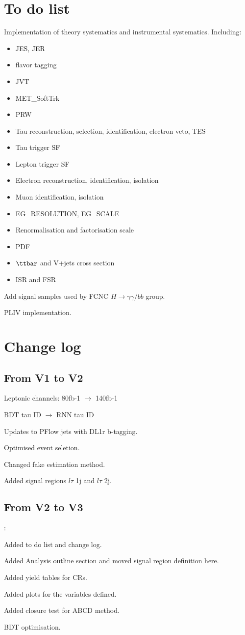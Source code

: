 \section{To do list}

Implementation of theory systematics and instrumental systematics. Including:

\begin{itemize}
	\item JES, JER
	\item flavor tagging
	\item JVT
	\item MET\_SoftTrk
	\item PRW
	\item Tau reconstruction, selection, identification, electron veto, TES
	\item Tau trigger SF
	\item Lepton trigger SF
	\item Electron reconstruction, identification, isolation
	\item Muon identification, isolation
	\item EG\_RESOLUTION, EG\_SCALE
	\item Renormalisation and factorisation scale
	\item PDF
	\item $\ttbar$ and V+jets cross section
	\item ISR and FSR
\end{itemize}

Add signal samples used by FCNC $H\to \gamma\gamma/bb$ group.

PLIV implementation.

\section{Change log}

\subsection{From V1 to V2}

Leptonic channels:  80fb-1 $\to$ 140fb-1

BDT tau ID $\to$ RNN tau ID

Updates to PFlow jets with DL1r b-tagging.

Optimised event seletion.

Changed fake estimation method.

Added signal regions $l\tau$ 1j and $l\tau$ 2j.

\subsection{From V2 to V3}:

Added to do list and change log.

Added Analysis outline section and moved signal region definition here.

Added yield tables for CRs.

Added plots for the variables defined.

Added closure test for ABCD method.

BDT optimisation.